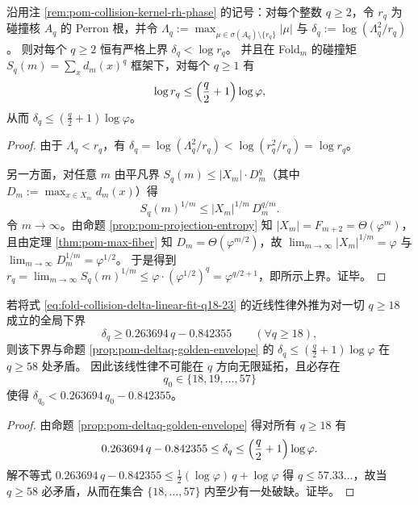 \begin{proposition}\label{prop:pom-deltaq-golden-envelope}
沿用注 \ref{rem:pom-collision-kernel-rh-phase} 的记号：对每个整数 \(q\ge 2\)，令 \(r_q\) 为碰撞核 \(A_q\) 的 Perron 根，并令
\(
\Lambda_q:=\max_{\mu\in\sigma(A_q)\setminus\{r_q\}}|\mu|
\)
与
\(
\delta_q:=\log(\Lambda_q^2/r_q)
\)。
则对每个 \(q\ge 2\) 恒有严格上界 \(\delta_q<\log r_q\)。
并且在 Fold\(_m\) 的碰撞矩 \(S_q(m)=\sum_x d_m(x)^q\) 框架下，对每个 \(q\ge 1\) 有
\[
\log r_q\le \Bigl(\frac{q}{2}+1\Bigr)\log\varphi,
\]
从而 \(\delta_q\le (\frac{q}{2}+1)\log\varphi\)。
\end{proposition}
\begin{proof}
由于 \(\Lambda_q<r_q\)，有
\(
\delta_q=\log(\Lambda_q^2/r_q)<\log(r_q^2/r_q)=\log r_q
\)。
\par
另一方面，对任意 \(m\) 由平凡界 \(S_q(m)\le |X_m|\cdot D_m^q\)（其中 \(D_m:=\max_{x\in X_m}d_m(x)\)）得
\[
S_q(m)^{1/m}\le |X_m|^{1/m}\,D_m^{q/m}.
\]
令 \(m\to\infty\)。由命题 \ref{prop:pom-projection-entropy} 知 \(|X_m|=F_{m+2}=\Theta(\varphi^m)\)，且由定理 \ref{thm:pom-max-fiber} 知 \(D_m=\Theta(\varphi^{m/2})\)，故
\(
\lim_{m\to\infty}|X_m|^{1/m}=\varphi
\)
与
\(
\lim_{m\to\infty}D_m^{1/m}=\varphi^{1/2}
\)。
于是得到
\(
r_q=\lim_{m\to\infty}S_q(m)^{1/m}\le \varphi\cdot(\varphi^{1/2})^{q}=\varphi^{q/2+1}
\)，即所示上界。证毕。
\end{proof}

\begin{corollary}[近线性拟合外推的显式破缺阈值]\label{cor:pom-deltaq-linear-extrapolation-break}
若将式 \eqref{eq:fold-collision-delta-linear-fit-q18-23} 的近线性律外推为对一切 \(q\ge 18\) 成立的全局下界
\[
\delta_q\ge 0.263694\,q-0.842355\qquad(\forall q\ge 18),
\]
则该下界与命题 \ref{prop:pom-deltaq-golden-envelope} 的 \(\delta_q\le (\frac{q}{2}+1)\log\varphi\) 在 \(q\ge 58\) 处矛盾。
因此该线性律不可能在 \(q\) 方向无限延拓，且必存在
\[
q_0\in\{18,19,\dots,57\}
\]
使得 \(\delta_{q_0}<0.263694\,q_0-0.842355\)。
\end{corollary}
\begin{proof}
由命题 \ref{prop:pom-deltaq-golden-envelope} 得对所有 \(q\ge 18\) 有
\[
0.263694\,q-0.842355\le \delta_q\le \Bigl(\frac{q}{2}+1\Bigr)\log\varphi.
\]
解不等式
\(
0.263694\,q-0.842355\le \frac12(\log\varphi)\,q+\log\varphi
\)
得 \(q\le 57.33\ldots\)，故当 \(q\ge 58\) 必矛盾，从而在集合 \(\{18,\dots,57\}\) 内至少有一处破缺。证毕。
\end{proof}

